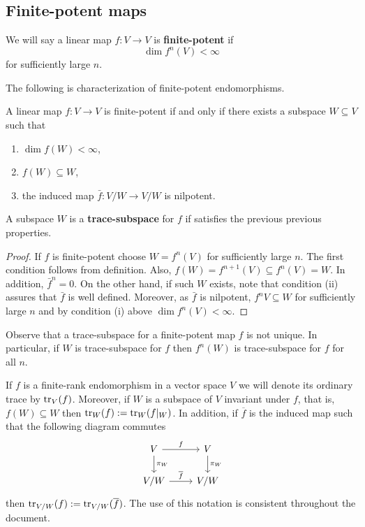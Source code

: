 \subsection*{Finite-potent maps}
\begin{definition}\label{def:finite-potent}
	We will say a linear map $f\colon V \to V$ is \textbf{finite-potent} if
	\[
		\dim f^{n}(V) < \infty
	\]
	for sufficiently large $n$.
\end{definition}
The following is characterization of finite-potent endomorphisms.
\begin{lemma}\label{lemm:characterization-of-finite-potent-maps}
	A linear map $f\colon V \to V$ is finite-potent if and only if there exists a subspace $W \subseteq V$ such that
	\begin{enumerate}[label = (\roman*)]
		\item $\dim f(W) < \infty$,
		\item $f(W) \subseteq W$,
		\item the induced map $\bar{f}\colon V/W \to V/W$ is nilpotent.
	\end{enumerate}
	A subspace $W$ is a \textbf{trace-subspace} for $f$ if satisfies the previous previous properties.   
\end{lemma}
\begin{proof}
	If $f$ is finite-potent choose $W = f^{n}(V)$ for sufficiently large $n$. The first condition follows from definition. Also, $f(W) = f^{n+1}(V) \subseteq f^{n}(V) = W$. In addition, $\bar{f}^{n} = 0$. On the other hand, if such $W$ exists, note that condition (ii) assures that $\bar{f}$ is well defined. Moreover, as $\bar{f}$ is nilpotent, $f^{n}V \subseteq W$ for sufficiently large $n$ and by condition (i) above $\dim f^{n}(V) < \infty$.
\end{proof}
Observe that a trace-subspace for a finite-potent map $f$ is not unique. In particular, if $W$ is trace-subspace for $f$ then $f^{n}(W)$ is trace-subspace for $f$ for all $n$.
\begin{notation}\label{not:trace}
	If $f$ is a finite-rank endomorphism in a vector space $V$ we will denote its ordinary trace by $\operatorname{tr}_{V}(f)$. Moreover, if $W$ is a subspace of $V$ invariant under $f$, that is, $f(W) \subseteq W$ then $\operatorname{tr}_{W}(f) := \operatorname{tr}_{W}(f\lvert_{W})$. In addition, if $\overline{f}$ is the induced map such that the following diagram commutes
	\[
	\begin{tikzcd}
		V \arrow[r, "f"] \arrow[d, "\pi_{W}"] & V \arrow[d, "\pi_{W}"] \\
		V/W \arrow[r, "\overline{f}"] & V/W
	\end{tikzcd} 
	\]
	then $\operatorname{tr}_{V/W}(f) := \operatorname{tr}_{V/W}(\overline{f})$. The use of this notation is consistent throughout the document. 
\end{notation}
